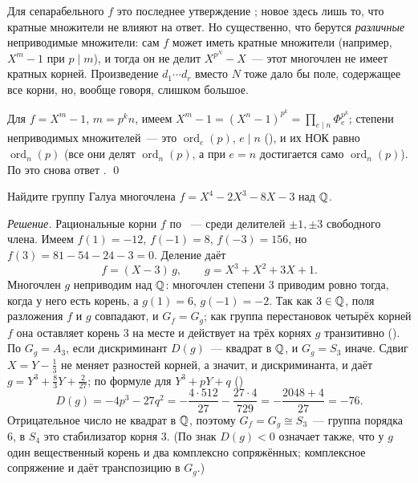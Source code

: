 Для сепарабельного $f$ это последнее утверждение ; новое здесь лишь то, что кратные множители не влияют на ответ.
Но существенно, что берутся \emph{различные} неприводимые множители: сам $f$ может иметь кратные множители (например,
$X^m-1$ при $p\mid m$), и тогда он не делит $X^{p^N}-X$~--- этот многочлен не имеет кратных корней. Произведение
$d_1\cdots d_r$ вместо $N$ тоже дало бы поле, содержащее все корни, но, вообще говоря, слишком большое.

Для $f=X^m-1$, $m=p^kn$, имеем $X^m-1=(X^n-1)^{p^k}=\prod_{e\mid n}\Phi_e^{p^k}$; степени неприводимых множителей~--- это
$\operatorname{ord}_e(p)$, $e\mid n$ (), и их НОК равно $\operatorname{ord}_n(p)$ (все они делят $\operatorname{ord}_n(p)$, а
при $e=n$ достигается само $\operatorname{ord}_n(p)$). По  это снова ответ . \qed

\begin{exercise}[4-2]
Найдите группу Галуа многочлена $f=X^4-2X^3-8X-3$ над $\mathbb Q$.
\end{exercise}

\noindent\emph{Решение.} Рациональные корни $f$ по ~--- среди делителей $\pm1,\pm3$ свободного члена. Имеем
$f(1)=-12$, $f(-1)=8$, $f(-3)=156$, но $f(3)=81-54-24-3=0$. Деление даёт
\[
f=(X-3)\,g,\qquad g=X^3+X^2+3X+1 .
\]
Многочлен $g$ неприводим над $\mathbb Q$: многочлен степени $3$ приводим ровно тогда, когда у него есть корень, а
$g(1)=6$, $g(-1)=-2$. Так как $3\in\mathbb Q$, поля разложения $f$ и $g$ совпадают, и $G_f=G_g$; как группа перестановок четырёх
корней $f$ она оставляет корень $3$ на месте и действует на трёх корнях $g$ транзитивно (). По  $G_g=A_3$, если
дискриминант $D(g)$~--- квадрат в $\mathbb Q$, и $G_g=S_3$ иначе. Сдвиг $X=Y-\frac13$ не меняет разностей корней, а значит, и
дискриминанта, и даёт $g=Y^3+\frac83Y+\frac2{27}$; по формуле для $Y^3+pY+q$ ()
\[
D(g)=-4p^3-27q^2=-\frac{4\cdot512}{27}-\frac{27\cdot4}{729}=-\frac{2048+4}{27}=-76 .
\]
Отрицательное число не квадрат в $\mathbb Q$, поэтому $G_f=G_g\cong S_3$~--- группа порядка $6$, в $S_4$ это стабилизатор
корня $3$. (По  знак $D(g)<0$ означает также, что у $g$ один вещественный корень и два комплексно сопряжённых;
комплексное сопряжение и даёт транспозицию в $G_g$.)

